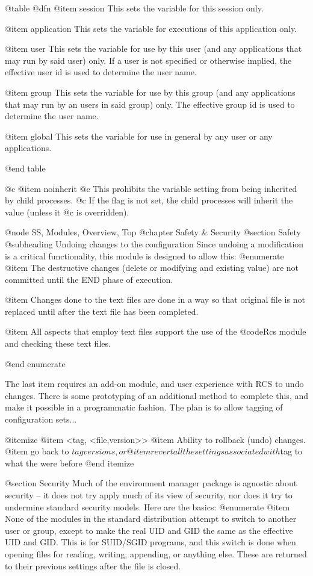{{@table @dfn
@item session
This sets the variable for this session only.

@item application
This sets the variable for executions of this application only.

@item user
This sets the variable for use by this user (and any applications that may
run by said user) only.  If a user is not specified or otherwise implied, the
effective user id is used to determine the user name.

@item group
This sets the variable for use by this group (and any applications that may
run by an users in said group) only.  The effective group id is used to
determine the user name.

@item global
This sets the variable for use in general by any user or any applications.

@end table


@c @item noinherit
@c This prohibits the variable setting from being inherited by child processes.
@c If the flag is not set, the child processes will inherit the value (unless it
@c is overridden).

@node SS, Modules, Overview, Top
@chapter Safety & Security
@section Safety
@subheading Undoing changes to the configuration
Since undoing a modification is a critical functionality, this module is
designed to allow this:
@enumerate
@item The destructive changes (delete or modifying and existing value) are not
committed until the END phase of execution.

@item Changes done to the text files are done in a way so that original file
is not replaced until after the text file has been completed.

@item All aspects that employ text files support the use of the @code{Rcs}
module and checking these text files.

@end enumerate

The last item requires an add-on module, and user experience with RCS to
undo changes.  There is some prototyping of an additional method to complete
this, and make it possible in a programmatic fashion.  The plan is to allow
tagging of configuration sets...

@itemize
@item <tag, {<file,version>}>
@item Ability to rollback (undo) changes.
@item go back to $tag versions, or
@item revert all the settings associated with $tag to what the were before
@end itemize

@section Security
Much of the environment manager package is agnostic about security -- it does
not try apply much of its view of security, nor does it try to undermine
standard security models.   Here are the basics:
@enumerate
@item None of the modules in the standard distribution attempt to switch
to another user or group, except to make the real UID and GID the same as the
effective UID and GID.  This is for SUID/SGID programs, and this switch is
done when opening files for reading, writing, appending, or anything else.
These are returned to their previous settings after the file is closed.

}}

